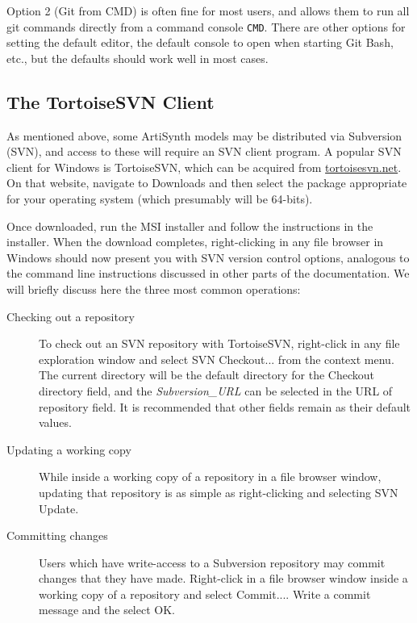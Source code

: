 Option 2 (Git from CMD) is often fine for most users, and allows them
to run all git commands directly from a command console {\tt CMD}.  There are
other options for setting the default editor, the default
console to open when starting Git Bash, etc., but the defaults should
work well in most cases.

\subsection{The TortoiseSVN Client}
\label{TortoiseSVN}

As mentioned above, some ArtiSynth models may be distributed via
Subversion (SVN), and access to these will require an SVN client
program. A popular SVN client for Windows is TortoiseSVN, which can be
acquired from
\href{http://tortoisesvn.net}{tortoisesvn.net}. On that website,
navigate to {\sf Downloads} and then select the package appropriate
for your operating system (which presumably will be 64-bits).

Once downloaded, run the MSI installer and follow the instructions in
the installer. When the download completes, right-clicking in any file
browser in Windows should now present you with SVN version control
options, analogous to the command line instructions discussed in other
parts of the documentation. We will briefly discuss here the three
most common operations:

\begin{description}

\item[Checking out a repository]

To check out an SVN repository with TortoiseSVN, right-click in any
file exploration window and select {\sf SVN Checkout...} from the
context menu. The current directory will be the default directory for
the {\sf Checkout directory} field, and the {\it Subversion\_URL} can
be selected in the {\sf URL of repository} field. It is recommended
that other fields remain as their default values.

\item[Updating a working copy]

While inside a working copy of a repository in a file browser window,
updating that repository is as simple as right-clicking and selecting
{\sf SVN Update}.

\item[Committing changes]

Users which have write-access to a Subversion repository may commit
changes that they have made.  Right-click in a file browser window
inside a working copy of a repository and select {\sf
Commit...}. Write a commit message and the select {\sf OK}.

\end{description}

